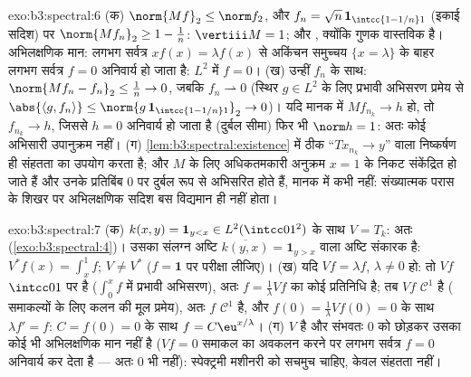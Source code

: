 \begin{solution}{exo:b3:spectral:6}
(क) $\norm{Mf}_2 \leq \norm f_2$, और $f_n = \sqrt n\,
\mathbf 1_{\intcc{1 - 1/n}1}$ (इकाई सदिश) पर $\norm{Mf_n}_2
\geq 1 - \frac1n$: $\vertiii M = 1$; और , क्योंकि
गुणक वास्तविक है। अभिलक्षणिक मान: लगभग सर्वत्र $xf(x) = \lambda f(x)$ से अकिंचन समुच्चय
$\{x = \lambda\}$ के बाहर लगभग सर्वत्र $f = 0$ अनिवार्य हो जाता है: $L^2$ में $f =
0$।
(ख) उन्हीं $f_n$ के साथ: $\norm{Mf_n - f_n}_2 \leq \frac1n \to
0$, जबकि $f_n \rightharpoonup 0$ (स्थिर $g \in L^2$ के लिए प्रभावी
अभिसरण प्रमेय से $\abs{\langle g, f_n\rangle} \leq \norm{g\,\mathbf
1_{\intcc{1-1/n}1}}_2 \to 0$)। यदि मानक में $Mf_{n_k} \to h$ हो, तो $f_{n_k} \to h$, जिससे $h = 0$
अनिवार्य हो जाता है (दुर्बल सीमा) फिर भी $\norm h = 1$: अतः कोई अभिसारी
उपानुक्रम नहीं।
(ग) \cref{lem:b3:spectral:existence} में ठीक ``$Tx_{n_k} \to y$'' वाला निष्कर्षण ही संहतता का उपयोग करता
है; और $M$ के लिए अधिकतमकारी अनुक्रम $x = 1$ के निकट संकेंद्रित हो
जाते हैं और उनके प्रतिबिंब $0$ पर दुर्बल रूप से अभिसरित होते हैं,
मानक में कभी नहीं: संख्यात्मक परास के शिखर पर अभिलक्षणिक सदिश बस
विद्यमान ही नहीं होता।
\end{solution}

\begin{solution}{exo:b3:spectral:7}
(क) $k(x, y) = \mathbf 1_{y < x} \in
L^2(\intcc01^2)$ के साथ $V = T_k$: अतः  (\cref{exo:b3:spectral:4})। उसका संलग्न अष्टि $\overline{k(y,
x)} = \mathbf 1_{y > x}$
वाला अष्टि संकारक है: $V^*f(x) = \int_x^1f$; $V \neq V^*$ ($f = \mathbf 1$ पर परीक्षा लीजिए)।
(ख) यदि $Vf = \lambda f$, $\lambda \ne 0$ हो: तो $Vf$ $\intcc01$ पर  है ($\int_0^x f$ में प्रभावी
अभिसरण), अतः $f
= \frac1\lambda Vf$ का कोई  प्रतिनिधि है; तब $Vf$ $\mathcal C^1$ है (
समाकल्यों के लिए कलन की मूल प्रमेय), अतः $f$ $\mathcal C^1$ है, और $f(0) = \frac1\lambda Vf(0) = 0$
के साथ $\lambda f' = f$: $C = f(0) = 0$ के साथ $f =
C\eu^{x/\lambda}$।
(ग) $V$  है और संभवतः $0$ को छोड़कर उसका कोई भी अभिलक्षणिक
मान नहीं है ($Vf = 0$ समाकल का अवकलन करने पर लगभग सर्वत्र $f = 0$ अनिवार्य
कर देता है --- अतः $0$ भी नहीं): स्पेक्ट्रमी मशीनरी को सचमुच
 चाहिए, केवल संहतता नहीं।
\end{solution}

